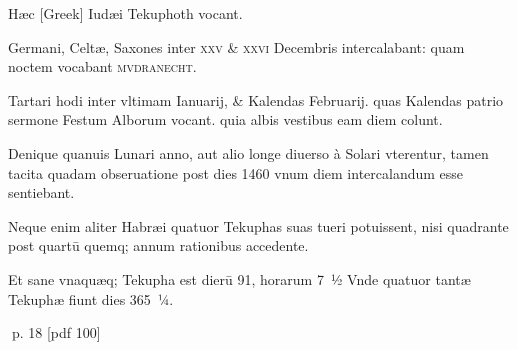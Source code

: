 \begin{parnumbers}
Hæc \textgreek{[Greek]} Iudæi Tekuphoth vocant.

Germani, Celtæ, Saxones inter \textsc{xxv \& xxvi} Decembris intercalabant: quam noctem vocabant \textsc{mvdranecht}.

Tartari hodi inter vltimam Ianuarij, \& Kalendas Februarij. quas Kalendas patrio sermone Festum Alborum vocant. quia albis vestibus eam diem colunt.

Denique quanuis  Lunari anno, aut alio longe diuerso à Solari vterentur, tamen tacita quadam obseruatione post dies 1460 vnum diem intercalandum esse sentiebant.

Neque enim aliter Habræi quatuor Tekuphas suas tueri potuissent, nisi quadrante post quartū quemq; annum rationibus accedente.

Et sane vnaquæq; Tekupha est dierū 91, horarum 7 ½ Vnde quatuor tantæ Tekuphæ fiunt dies 365 ¼.

\end{parnumbers}
\clearpage
p. 18 [pdf 100]

